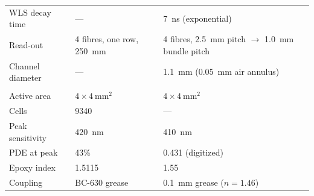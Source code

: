 \documentclass[preprint,12pt]{elsarticle}
\begin{document}
\begin{table}[htbp]
\begin{tabularx}{\textwidth}{@{}>{\raggedright\arraybackslash}p{} L L@{}}
WLS decay time & --- & \SI{7}{\nano\second} (exponential) \\
Read-out & 4 fibres, one row, \SI{250}{\milli\meter} & 4 fibres, \SI{2.5}{\milli\meter} pitch $\to$ \SI{1.0}{\milli\meter} bundle pitch \\
Channel diameter & --- & \SI{1.1}{\milli\meter} (\SI{0.05}{\milli\meter} air annulus) \\
\midrule
{}\\
Active area & $4\times\SI{4}{\milli\meter\squared}$ & $4\times\SI{4}{\milli\meter\squared}$ \\
Cells & 9340 & --- \\
Peak sensitivity & \SI{420}{\nano\meter} & \SI{410}{\nano\meter} \\
PDE at peak & 43\% & 0.431 (digitized) \\
Epoxy index & 1.5115 & 1.55 \\
Coupling & BC-630 grease & \SI{0.1}{\milli\meter} grease ($n=1.46$) \\
\bottomrule
\end{tabularx}
\end{table}
\end{document}
